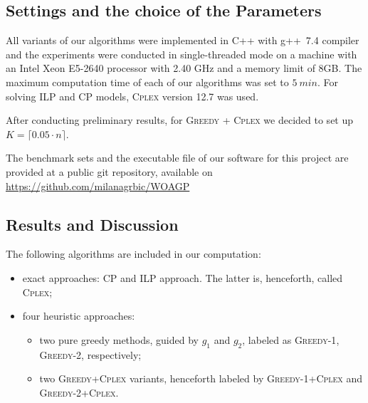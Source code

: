 \documentclass[runningheads,a4paper]{elsarticle}
\begin{document}
     \subsection{Settings and the choice of the Parameters}
      All variants of our algorithms were implemented in C++ with g++~7.4 compiler and the experiments were conducted in single-threaded mode on a machine with an Intel Xeon E5-2640 processor with 2.40 GHz and a memory limit of 8GB. The maximum computation time of each of our algorithms was set to $5\ min$. For solving ILP and CP models, \textsc{Cplex} version 12.7 was used.

      After conducting preliminary results, for
        \textsc{Greedy + \textsc{Cplex}} we decided to set up $K = \lceil 0.05 \cdot n \rceil$.

     The benchmark sets and the executable file of our software for this project are provided at a public git repository, available on \href{https://github.com/milanagrbic/WOAGP}{https://github.com/milanagrbic/WOAGP}
	\subsection{Results and Discussion}
        The following algorithms are included in our computation:
        \begin{itemize}
        	\item  exact approaches: CP and ILP approach. The latter is, henceforth, called \textsc{Cplex};
            \item four heuristic approaches:
           \begin{itemize}
           	\item two pure greedy methods, guided by $g_1$ and $g_2$, labeled as \textsc{Greedy-1}, \textsc{Greedy-2}, respectively;
            \item two \textsc{Greedy+Cplex} variants, henceforth labeled by  \textsc{Greedy-1}+\textsc{Cplex} and
            \textsc{Greedy-2}+\textsc{Cplex}.
        \end{itemize}
    \end{itemize}
\end{document}
